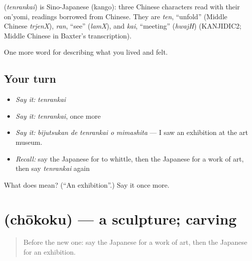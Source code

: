 \begin{cousinweb}
\textbf{} (\emph{tenrankai}) is Sino-Japanese (kango): three Chinese characters read with their on'yomi, readings borrowed from Chinese. They are \emph{ten}, \textquotedblleft{}unfold\textquotedblright{} (Middle Chinese \emph{trjenX}), \emph{ran}, \textquotedblleft{}see\textquotedblright{} (\emph{lamX}), and \emph{kai}, \textquotedblleft{}meeting\textquotedblright{} (\emph{hwajH}) (KANJIDIC2; Middle Chinese in Baxter's transcription).
\end{cousinweb}

\begin{grammarlens}[title={What you've built}]
One more word for describing what you lived and felt.
\end{grammarlens}

\subsection*{Your turn}
\begin{itemize}
\raggedright
  \item \emph{Say it:} \emph{tenrankai}
  \item \emph{Say it:} \emph{tenrankai}, once more
  \item \emph{Say it:} \emph{bijutsukan de tenrankai o mimashita} — I saw an exhibition at the art museum.
  \item \emph{Recall:} say the Japanese for to whittle, then the Japanese for a work of art, then say \emph{tenrankai} again
\end{itemize}

\begin{tcolorbox}[breakable,colback=teal!4,colframe=teal!35!black,title={Before you move on}]
What does  mean? (\textquotedblleft{}An exhibition\textquotedblright{}.) Say it once more.
\end{tcolorbox}
\section[\texorpdfstring{\ja{ちょうこく} (chōkoku)}{ちょうこく (chōkoku)}]{ (chōkoku) — a sculpture; carving}

\label{lesson:JA-C468-choukoku}



\begin{quote}
Before the new one: say the Japanese for a work of art, then the Japanese for an exhibition.
\end{quote}


